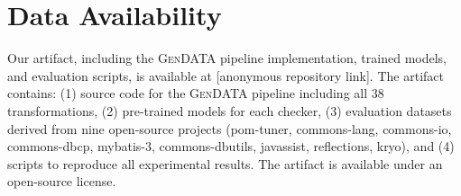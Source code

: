 \documentclass[acmsmall,screen,review,anonymous]{acmart}
\newcommand{\gendata}{\textsc{GenDATA}\xspace}
\begin{document}
\section*{Data Availability}
\label{sec:data}

Our artifact, including the \gendata pipeline implementation, trained models, and evaluation scripts, is available at [anonymous repository link]. The artifact contains: (1) source code for the \gendata pipeline including all 38 transformations, (2) pre-trained models for each checker, (3) evaluation datasets derived from nine open-source projects (pom-tuner, commons-lang, commons-io, commons-dbcp, mybatis-3, commons-dbutils, javassist, reflections, kryo), and (4) scripts to reproduce all experimental results. The artifact is available under an open-source license.

\end{document}
